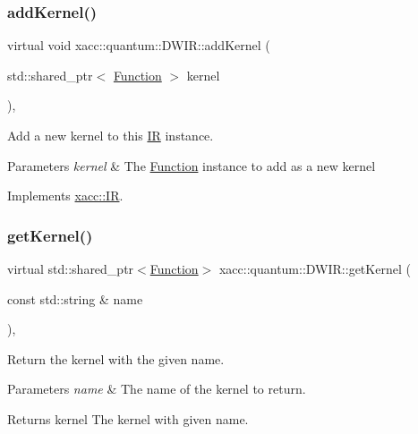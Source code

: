 \subsubsection{\texorpdfstring{add\+Kernel()}{addKernel()}}
{\footnotesize\ttfamily virtual void xacc\+::quantum\+::\+D\+W\+I\+R\+::add\+Kernel (\begin{DoxyParamCaption}\item[{std\+::shared\+\_\+ptr$<$ \hyperlink{a01151}{Function} $>$}]{kernel }\end{DoxyParamCaption})\hspace{0.3cm}{\ttfamily [inline]}, {\ttfamily [virtual]}}

Add a new kernel to this \hyperlink{a01175}{IR} instance.


\begin{DoxyParams}{Parameters}
{\em kernel} & The \hyperlink{a01151}{Function} instance to add as a new kernel \\
\hline
\end{DoxyParams}


Implements \hyperlink{a01175_abbbf8e6993c518597de32cd05d49d737}{xacc\+::\+IR}.

\mbox{\label{a00979_a38d8bdd24250749bc38ad31f8512fcfc}} 
\subsubsection{\texorpdfstring{get\+Kernel()}{getKernel()}}
{\footnotesize\ttfamily virtual std\+::shared\+\_\+ptr$<$\hyperlink{a01151}{Function}$>$ xacc\+::quantum\+::\+D\+W\+I\+R\+::get\+Kernel (\begin{DoxyParamCaption}\item[{const std\+::string \&}]{name }\end{DoxyParamCaption})\hspace{0.3cm}{\ttfamily [inline]}, {\ttfamily [virtual]}}

Return the kernel with the given name.


\begin{DoxyParams}{Parameters}
{\em name} & The name of the kernel to return. \\
\hline
\end{DoxyParams}
\begin{DoxyReturn}{Returns}
kernel The kernel with given name. 
\end{DoxyReturn}



